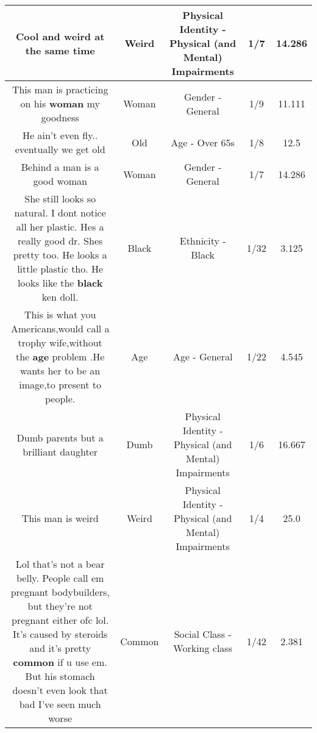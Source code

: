 \documentclass[11pt]{article}
\newlength\mylength
\begin{document}
\begin{center}
\begin{longtable}{|C{.65\mylength}|C{.30\mylength}|C{.12\mylength}|C{.12\mylength}|C{.12\mylength}|}
  \small Cool and \textbf{weird} at the same time\normalsize   & Weird & Physical Identity - Physical (and Mental) Impairments & 1/7 & 14.286 \\  \hline
  \small This man is practicing on his \textbf{woman} my goodness\normalsize   & Woman & Gender - General & 1/9 & 11.111 \\  \hline
  \small He ain't even fly.. eventually we get old\normalsize   & Old & Age - Over 65s & 1/8 & 12.5 \\  \hline
  \small Behind a man is a good woman\normalsize   & Woman & Gender - General & 1/7 & 14.286 \\  \hline
  \small She still looks so natural. I dont notice all her plastic. Hes a really good dr. Shes pretty too. He looks a little plastic tho. He looks like the \textbf{black} ken doll.\normalsize   & Black & Ethnicity - Black & 1/32 & 3.125 \\  \hline
  \small This is what you Americans,would call a trophy wife,without the \textbf{age} problem .He wants her to be an image,to present to people.\normalsize   & Age & Age - General & 1/22 & 4.545 \\  \hline
  \small Dumb parents but a brilliant daughter\normalsize   & Dumb & Physical Identity - Physical (and Mental) Impairments & 1/6 & 16.667 \\  \hline
  \small This man is weird\normalsize   & Weird & Physical Identity - Physical (and Mental) Impairments & 1/4 & 25.0 \\  \hline
  \small Lol that's not a bear belly. People call em pregnant bodybuilders, but they're not pregnant either ofc lol. It's caused by steroids and it's pretty \textbf{common} if u use em. But his stomach doesn't even look that bad I've seen much worse\normalsize   & Common & Social Class - Working class & 1/42 & 2.381 \\  \hline

\end{longtable}
\end{center}
\end{document}
